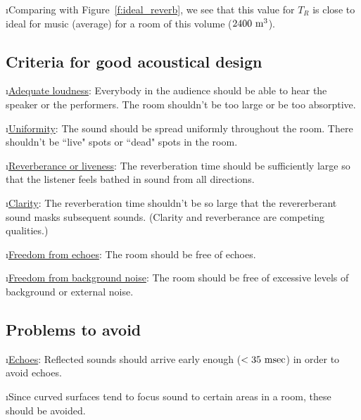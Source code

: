 \i Comparing with Figure~\ref{f:ideal_reverb}, we see that this
value for $T_R$ is close to ideal for music (average) for a room 
of this volume ($2400~{\rm m}^3$).

\ei

\subsection{Criteria for good acoustical design}
\bi

\i \underline{Adequate loudness}: 
Everybody in the audience should be able to hear the 
speaker or the performers.
The room shouldn't be too large or be too absorptive.

\i \underline{Uniformity}: 
The sound should be spread uniformly throughout the 
room.
There shouldn't be ``live" spots or ``dead" spots
in the room.

\i \underline{Reverberance or liveness}:
The reverberation time should be sufficiently large 
so that the listener feels bathed in sound from all 
directions.

\i \underline{Clarity}:
The reverberation time shouldn't be so large that 
the revererberant sound masks subsequent sounds.
(Clarity and reverberance are competing qualities.)

\i \underline{Freedom from echoes}:
The room should be free of echoes.

\i \underline{Freedom from background noise}:
The room should be free of excessive levels of 
background or external noise.

\ei
\subsection{Problems to avoid}
\bi

\i \underline{Echoes}: 
Reflected sounds should arrive early 
enough ($<35~{\rm msec}$) in order to avoid echoes.

\i Since curved surfaces tend to focus sound to 
certain areas in a room, these should be avoided.

